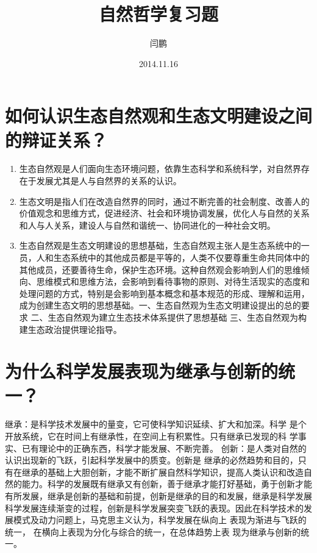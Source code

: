 \documentclass[a4paper]{article}
\begin{document}
\title{自然哲学复习题}
\author{闫鹏}
\date{2014.11.16}
\maketitle


\section{如何认识生态自然观和生态文明建设之间的辩证关系？}
\begin{enumerate}
\item 生态自然观是人们面向生态环境问题，依靠生态科学和系统科学，对自然界存在于发展尤其是人与自然界的关系的认识。
\item 生态文明是指人们在改造自然界的同时，通过不断完善的社会制度、改善人的价值观念和思维方式，促进经济、社会和环境协调发展，优化人与自然的关系和人与人关系，建设人与自然和谐统一、协同进化的一种社会文明。
\item 生态自然观是生态文明建设的思想基础，生态自然观主张人是生态系统中的一员，人和生态系统中的其他成员都是平等的，人类不仅要尊重生命共同体中的其他成员，还要善待生命，保护生态环境。这种自然观会影响到人们的思维倾向、思维模式和思维方法，会影响到看待事物的原则、对待生活现实的态度和处理问题的方式，特别是会影响到基本概念和基本规范的形成、理解和运用，成为创建生态文明的思想基础。一、生态自然观为生态文明建设提出的总的要求 二、生态自然观为建立生态技术体系提供了思想基础 三、生态自然观为构建生态政治提供理论指导。
\end{enumerate}

\section{为什么科学发展表现为继承与创新的统一？}

继承：是科学技术发展中的量变，它可使科学知识延续、扩大和加深。科学 是个开放系统，它在时间上有继承性，在空间上有积累性。只有继承已发现的科 学事实、已有理论中的正确东西，科学才能发展、不断完善。 创新：是人类对自然的认识出现新的飞跃，引起科学发展中的质变。创新是 继承的必然趋势和目的，只有在继承的基础上大胆创新，才能不断扩展自然科学知识，提高人类认识和改造自然的能力。科学的发展既有继承又有创新，善于继承才能打好基础，勇于创新才能有所发展，继承是创新的基础和前提，创新是继承的目的和发展，继承是科学发展科学发展连续渐变的过程，创新是科学发展突变飞跃的表现。因此在科学技术的发展模式及动力问题上，马克思主义认为，科学发展在纵向上 表现为渐进与飞跃的统一， 在横向上表现为分化与综合的统一，在总体趋势上表 现为继承与创新的统一。 
\end{document}
